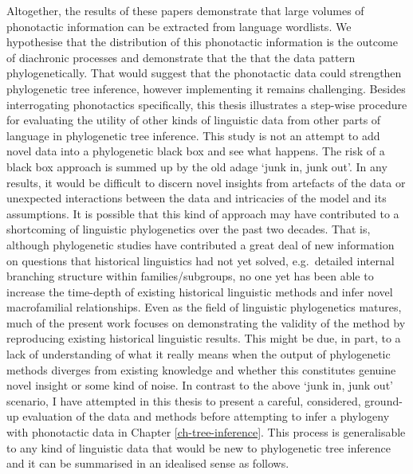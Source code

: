 Altogether, the results of these papers demonstrate that large volumes of phonotactic information can be extracted from language wordlists. We hypothesise that the distribution of this phonotactic information is the outcome of diachronic processes and demonstrate that the that the data pattern phylogenetically. That would suggest that the phonotactic data could strengthen phylogenetic tree inference, however implementing it remains challenging. Besides interrogating phonotactics specifically, this thesis illustrates a step-wise procedure for evaluating the utility of other kinds of linguistic data from other parts of language in phylogenetic tree inference. This study is not an attempt to add novel data into a phylogenetic black box and see what happens. The risk of a black box approach is summed up by the old adage `junk in, junk out'. In any results, it would be difficult to discern novel insights from artefacts of the data or unexpected interactions between the data and intricacies of the model and its assumptions. It is possible that this kind of approach may have contributed to a shortcoming of linguistic phylogenetics over the past two decades. That is, although phylogenetic studies have contributed a great deal of new information on questions that historical linguistics had not yet solved, e.g.~detailed internal branching structure within families/subgroups, no one yet has been able to increase the time-depth of existing historical linguistic methods and infer novel macrofamilial relationships. Even as the field of linguistic phylogenetics matures, much of the present work focuses on demonstrating the validity of the method by reproducing existing historical linguistic results. This might be due, in part, to a lack of understanding of what it really means when the output of phylogenetic methods diverges from existing knowledge and whether this constitutes genuine novel insight or some kind of noise. In contrast to the above `junk in, junk out' scenario, I have attempted in this thesis to present a careful, considered, ground-up evaluation of the data and methods before attempting to infer a phylogeny with phonotactic data in Chapter \ref{ch-tree-inference}. This process is generalisable to any kind of linguistic data that would be new to phylogenetic tree inference and it can be summarised in an idealised sense as follows.

